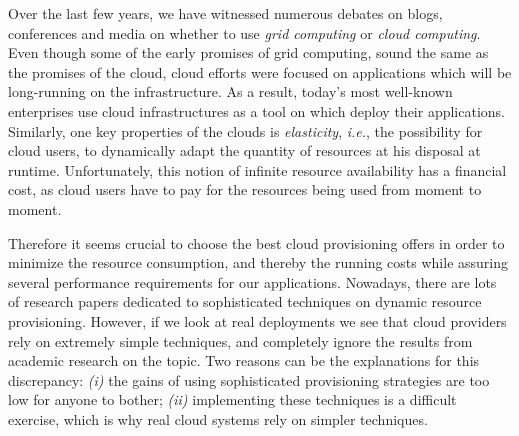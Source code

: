


Over the last few years, we have witnessed numerous debates on blogs, conferences and media on whether to use \emph{grid computing} or \emph{cloud computing}.  Even though some of the early promises of grid computing, sound the same as the promises of the cloud, cloud efforts were focused on applications which will be long-running on the infrastructure. As a result, today's most well-known enterprises use cloud infrastructures as a tool on which deploy their applications. Similarly, one key properties of the clouds is \emph{elasticity}, \emph{i.e.}, the possibility for cloud users, to dynamically adapt the quantity of resources at his disposal at runtime.  Unfortunately, this notion of infinite resource availability has a financial cost, as cloud users have to pay for the resources being used from moment to moment.  

Therefore it seems crucial to choose the best cloud provisioning offers in order to minimize the resource consumption, and thereby the running costs while assuring several performance requirements for our applications. Nowadays, there are lots of research papers dedicated to sophisticated techniques on dynamic resource provisioning. However, if we look at real deployments we see that cloud providers rely on extremely simple techniques, and completely ignore the results from academic research on the topic. Two reasons can be the explanations for this discrepancy: \emph{(i)} the gains of using sophisticated provisioning strategies are too low for anyone to bother; \emph{(ii)}  implementing these techniques is a difficult exercise, which is why real cloud systems rely on simpler techniques.

